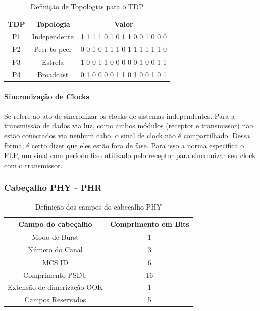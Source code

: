 	\begin{table}[ht]
		\caption{Definição de Topologias para o TDP}
		\centering
		\begin{tabular}{c c c}
			\hline
			TDP & Topologia & Valor\\ \hline
			P1 & Independente & 1 1 1 1 0 1 0 1 1 0 0 1 0 0 0 \\
			P2 & Peer-to-peer & 0 0 1 0 1 1 1 0 1 1 1 1 1 1 0 \\ 
			P3 & Estrela & 1 0 0 1 1 0 0 0 0 0 1 0 0 1 1 \\
			P4 & Broadcast & 0 1 0 0 0 0 1 1 0 1 0 0 1 0 1 \\
			\hline
		\end{tabular}
		\label{tab_tdpdef}
	\end{table}

	\paragraph{Sincronização de Clocks}
	
	Se refere ao ato de sincronizar os clocks de sistemas independentes. Para a transmissão de dados via luz, como ambos módulos (receptor e transmissor) não estão conectados via nenhum cabo, o sinal de clock não é compartilhado. Dessa forma, é certo dizer que eles estão fora de fase. Para isso a norma especifica o FLP, um sinal com período fixo utilizado pelo receptor para sincronizar seu clock com o transmissor.

	\subsubsection{Cabeçalho PHY - PHR}
	
	\begin{table}[ht]
		\caption{Definição dos campos do cabeçalho PHY}
		\centering
		\begin{tabular}{c c}
			\hline
			Campo do cabeçalho & Comprimento em Bits \\ \hline
			Modo de Burst & 1\\
			Número do Canal & 3\\ 
			MCS ID & 6\\
			Comprimento PSDU & 16\\
			Extensão de dimerização OOK & 1\\
			Campos Reservados & 5\\
			\hline
		\end{tabular}
		\label{tab_phy-header-def}
	\end{table}
	
